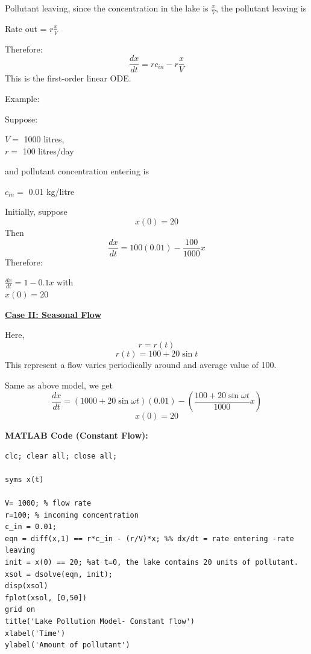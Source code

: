 \documentclass{article}
\begin{document}
\noindent
Pollutant leaving, since the concentration in the lake is $\frac{x}{V}$, the pollutant leaving is
\begin{center}
    Rate out = $r\frac{x}{V}$
\end{center}

\noindent
Therefore: 
\[\frac{dx}{dt} = rc_{in} - r\frac{x}{V}\]
This is the first-order linear ODE.

\vspace{2em}
\noindent
Example:

\noindent
Suppose:
\begin{center}
    $V =$ 1000 litres, \\
    $r =$ 100 litres/day
\end{center}
and pollutant concentration entering is 
\begin{center}
    $c_{in} =$ 0.01 kg/litre
\end{center}

\vspace{2em}
\noindent
Initially, suppose
\[x(0) = 20\]
Then
\[\frac{dx}{dt} = 100(0.01) - \frac{100}{1000}x\]
Therefore:
\begin{center}
    $\frac{dx}{dt} = 1 - 0.1x$ with \\
    $x(0) = 20$
\end{center}

\vspace{2em}
\noindent
\begin{center}
\textbf{\underline{Case II: Seasonal Flow}}
\end{center}

\noindent
Here, \[r = r(t)\]
\[r(t) = 100 + 20 \sin{t}\]
This represent a flow varies periodically around and average value of 100.

\noindent
Same as above model, we get
\[\frac{dx}{dt} = (1000+20\sin{\omega t})(0.01) - (\frac{100+20\sin{\omega t}}{1000}x)\]
\[x(0) = 20\]

\vspace{1em}
\noindent
\textbf{\large{MATLAB Code (Constant Flow):}}
\begin{lstlisting}
clc; clear all; close all;
            
syms x(t)
            
V= 1000; % flow rate
r=100; % incoming concentration
c_in = 0.01;
eqn = diff(x,1) == r*c_in - (r/V)*x; %% dx/dt = rate entering -rate leaving
init = x(0) == 20; %at t=0, the lake contains 20 units of pollutant.
xsol = dsolve(eqn, init);
disp(xsol)
fplot(xsol, [0,50])
grid on
title('Lake Pollution Model- Constant flow')
xlabel('Time')
ylabel('Amount of pollutant')
\end{lstlisting}
\end{document}
